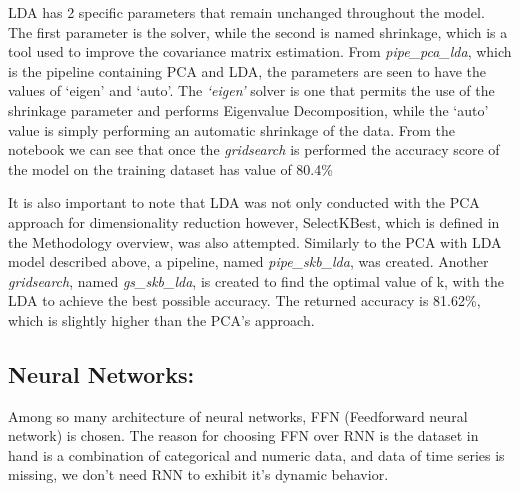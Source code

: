 \documentclass{article}
\begin{document}
LDA has 2 specific parameters that remain unchanged throughout the model. The first parameter is the solver, while the second is named shrinkage, which is a tool used to improve the covariance matrix estimation. From \textit{pipe\_pca\_lda}, which is the pipeline containing PCA and LDA, the parameters are seen to have the values of ‘eigen’ and ‘auto’. The \textit{‘eigen’} solver is one that permits the use of the shrinkage parameter and performs Eigenvalue Decomposition, while the ‘auto’ value is simply performing an automatic shrinkage of the data. From the notebook we can see that once the \textit{gridsearch} is performed the accuracy score of the model on the training dataset has value of 80.4\%

It is also important to note that LDA was not only conducted with the PCA approach for dimensionality reduction however, SelectKBest, which is defined in the Methodology overview, was also attempted. Similarly to the PCA with LDA model described above, a pipeline, named \textit{pipe\_skb\_lda}, was created. Another \textit{gridsearch}, named \textit{gs\_skb\_lda}, is created to find the optimal value of k, with the LDA to achieve the best possible accuracy. The returned accuracy is 81.62\%, which is slightly higher than the PCA’s approach. 

\subsection{Neural Networks:}
Among so many architecture of neural networks, FFN (Feedforward neural network) is chosen. The reason for choosing FFN over RNN is the dataset in hand is a combination of categorical and numeric data, and data of time series is missing, we don’t need RNN to exhibit it’s dynamic behavior. \\ \\
\end{document}

